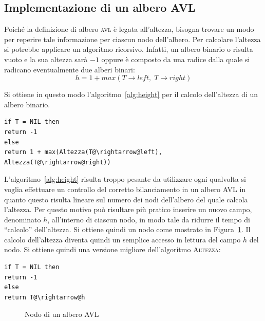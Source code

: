 \subsection{Implementazione di un albero AVL}

Poiché la definizione di albero \textsc{avl} è legata all'altezza, bisogna trovare un modo per reperire tale informazione per ciascun nodo dell'albero. Per calcolare l'altezza si potrebbe applicare un algoritmo ricorsivo. Infatti, un albero binario o risulta vuoto e la sua altezza sarà $-1$ oppure è composto da una radice dalla quale si radicano eventualmente due alberi binari:
\begin{equation}
h = 1 + max(T\rightarrow left, \; T\rightarrow right)
\end{equation}

Si ottiene in questo modo l'algoritmo~\ref{alg:height} per il calcolo dell'altezza di un albero binario.

\begin{lstlisting}[language=asd,caption={Altezza(T)},label=alg:height]
if T = NIL then
return -1
else
return 1 + max(Altezza(T@\rightarrow@left), Altezza(T@\rightarrow@right))
\end{lstlisting}

L'algoritmo~\ref{alg:height} risulta troppo pesante da utilizzare ogni qualvolta si voglia effettuare un controllo del corretto bilanciamento in un albero \textsc{AVL} in quanto questo risulta lineare sul numero dei nodi dell'albero del quale calcola l'altezza. Per questo motivo può risultare più pratico inserire un nuovo campo, denominato $h$, all'interno di ciascun nodo, in modo tale da ridurre il tempo di ``calcolo'' dell'altezza. Si ottiene quindi un nodo come mostrato in Figura~\ref{fig:nodo_avl}. Il calcolo dell'altezza diventa quindi un semplice accesso in lettura del campo $h$ del nodo. Si ottiene quindi una versione migliore dell'algoritmo \textsc{Altezza}:

\begin{lstlisting}[language=asd,caption={Altezza(T)},label={alg:height_avl}]
if T = NIL then
return -1
else
return T@\rightarrow@h
\end{lstlisting}

\begin{figure}[ht!]
\centering
{}
\caption{Nodo di un albero AVL}\label{fig:nodo_avl}
\end{figure}


